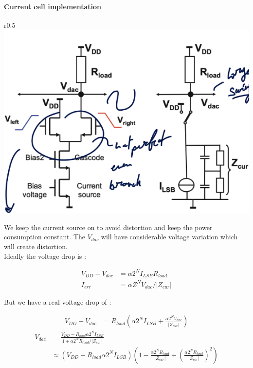 \documentclass[
  a4paper,
]{article}
\begin{document}
\hypertarget{current-cell-implementation}{%
\paragraph{Current cell
implementation}\label{current-cell-implementation}}

r0.5 \includegraphics{img/current_cell.png}

We keep the current source on to avoid distortion and keep the power
consumption constant. The \(V_{dac}\) will have considerable voltage
variation which will create distortion.\\
Ideally the voltage drop is :

\[\begin{aligned}
    V_{DD} - V_{dac} &= \alpha 2^N I_{LSB} R_{load}\\
    I_{err} &= \alpha Z^N V_{dac} / |Z_{cur}|
\end{aligned}\]

But we have a real voltage drop of :

\[\begin{aligned}
    V_{DD} - V_{dac} &= R_{load} \left( \alpha 2^N I_{LSB} + \frac{\alpha 2^N V_{dac}}{|Z_{cur}|} \right)
\end{aligned}\] \[\begin{aligned}
    V_{dac} &= \frac{V_{DD} - R_{load} \alpha 2^N I_{LSB}}{1 + \alpha 2^N R_{load} / |Z_{cur}|}\\
    &\approx (V_{DD} - R_{load} \alpha 2^N I_{LSB}) \left( 1- \frac{\alpha 2^N R_{load}}{|Z_{cur}|}  + \left( \frac{\alpha 2^N R_{load}}{|Z_{cur}|} \right)^2 \right)
\end{aligned}\]
\end{document}
